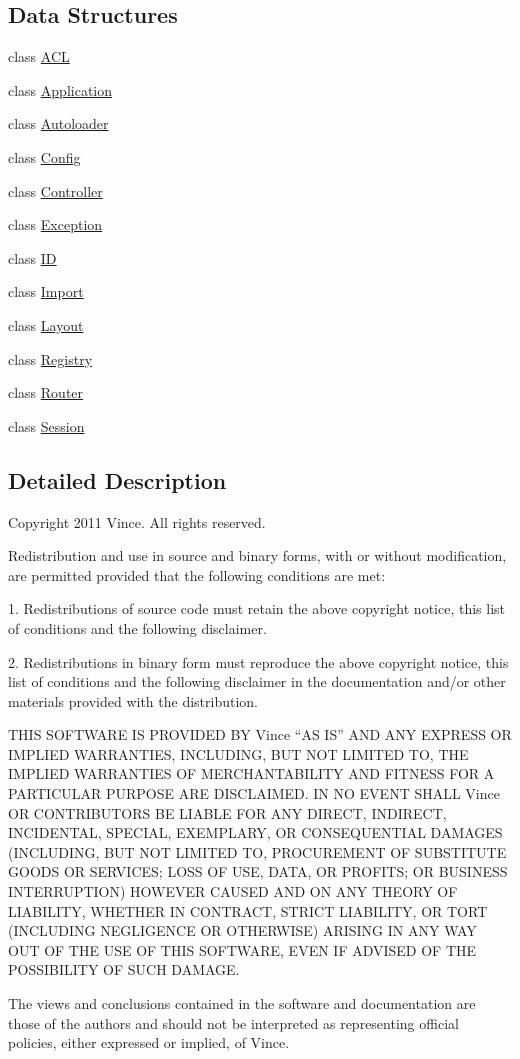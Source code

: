 \subsection*{Data Structures}
\begin{DoxyCompactItemize}
\item 
class \hyperlink{class_anemo_1_1_a_c_l}{ACL}
\item 
class \hyperlink{class_anemo_1_1_application}{Application}
\item 
class \hyperlink{class_anemo_1_1_autoloader}{Autoloader}
\item 
class \hyperlink{class_anemo_1_1_config}{Config}
\item 
class \hyperlink{class_anemo_1_1_controller}{Controller}
\item 
class \hyperlink{class_anemo_1_1_exception}{Exception}
\item 
class \hyperlink{class_anemo_1_1_i_d}{ID}
\item 
class \hyperlink{class_anemo_1_1_import}{Import}
\item 
class \hyperlink{class_anemo_1_1_layout}{Layout}
\item 
class \hyperlink{class_anemo_1_1_registry}{Registry}
\item 
class \hyperlink{class_anemo_1_1_router}{Router}
\item 
class \hyperlink{class_anemo_1_1_session}{Session}
\end{DoxyCompactItemize}


\subsection{Detailed Description}
Copyright 2011 Vince. All rights reserved.

Redistribution and use in source and binary forms, with or without modification, are permitted provided that the following conditions are met:

1. Redistributions of source code must retain the above copyright notice, this list of conditions and the following disclaimer.

2. Redistributions in binary form must reproduce the above copyright notice, this list of conditions and the following disclaimer in the documentation and/or other materials provided with the distribution.

THIS SOFTWARE IS PROVIDED BY Vince ``AS IS'' AND ANY EXPRESS OR IMPLIED WARRANTIES, INCLUDING, BUT NOT LIMITED TO, THE IMPLIED WARRANTIES OF MERCHANTABILITY AND FITNESS FOR A PARTICULAR PURPOSE ARE DISCLAIMED. IN NO EVENT SHALL Vince OR CONTRIBUTORS BE LIABLE FOR ANY DIRECT, INDIRECT, INCIDENTAL, SPECIAL, EXEMPLARY, OR CONSEQUENTIAL DAMAGES (INCLUDING, BUT NOT LIMITED TO, PROCUREMENT OF SUBSTITUTE GOODS OR SERVICES; LOSS OF USE, DATA, OR PROFITS; OR BUSINESS INTERRUPTION) HOWEVER CAUSED AND ON ANY THEORY OF LIABILITY, WHETHER IN CONTRACT, STRICT LIABILITY, OR TORT (INCLUDING NEGLIGENCE OR OTHERWISE) ARISING IN ANY WAY OUT OF THE USE OF THIS SOFTWARE, EVEN IF ADVISED OF THE POSSIBILITY OF SUCH DAMAGE.

The views and conclusions contained in the software and documentation are those of the authors and should not be interpreted as representing official policies, either expressed or implied, of Vince. 